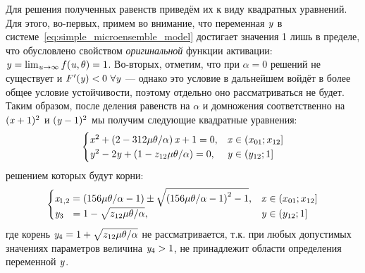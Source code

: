 Для решения полученных равенств приведём их к виду квадратных уравнений. Для этого, во-первых, примем во внимание, что переменная $\mathit{y}$ в системе~\eqref{eq:simple_microensemble_model} достигает значения 1 лишь в пределе, что обусловлено свойством \textit{оригинальной} функции активации: $\mathit{y} = \lim_{\mathit{u} \to \infty} f(\mathit{u}, \theta) = 1$. Во-вторых, отметим, что при $\alpha = 0$ решений не существует и $F^{\prime}(\mathit{y}) < 0\ \forall \mathit{y}$ --- однако это условие в дальнейшем войдёт в более общее условие устойчивости, поэтому отдельно оно рассматриваться не будет. Таким образом, после деления равенств на $\alpha$ и домножения соответственно на $(\mathit{x} + 1)^{2}$ и $(\mathit{y} - 1)^{2}$ мы получим следующие квадратные уравнения:
\begin{equation}
    \nonumber
    \begin{cases}
        \mathit{x}^{2} + \left( 2 - 312 \mu \theta / \alpha \right) \mathit{x} + 1 = 0,     & \mathit{x} \in \left(x_{01}; x_{12}\right] \\
        \mathit{y}^{2} - 2 \mathit{y} + \left( 1 - z_{12} \mu \theta / \alpha \right) = 0,  & \mathit{y} \in \left(y_{12}; 1\right] \\
    \end{cases}
\end{equation}
решением которых будут корни:
\begin{equation}
    \begin{cases}
        \mathit{x}_{1,2} = \left( 156 \mu \theta / \alpha - 1\right) \pm \sqrt{\left( 156 \mu \theta / \alpha - 1\right)^{2} - 1}, & \mathit{x} \in \left(x_{01}; x_{12}\right] \\
        \mathit{y}_{3\phantom{,4}}   = 1 - \sqrt{z_{12} \mu \theta / \alpha},                                                      & \mathit{y} \in \left(y_{12}; 1\right] \\
    \end{cases}
\end{equation}
где корень $\mathit{y}_{4} = 1 + \sqrt{z_{12} \mu \theta / \alpha}$ не рассматривается, т.к. при любых допустимых значениях параметров величина $\mathit{y}_{4} > 1$, \ie не принадлежит области определения переменной $\mathit{y}$. 

